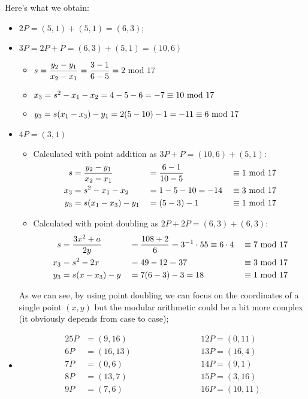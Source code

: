 \newpage
\hfill\break
Here's what we obtain:
\begin{itemize}
    \item $2P=(5,1)+(5,1)=(6,3)$;
    \item $3P=2P+P=(6,3)+(5,1)=(10,6)$
    \begin{itemize}
        \item[] $s=\dfrac{y_2-y_1}{x_2-x_1}=\dfrac{3-1}{6-5}=2\text{ mod } 17$
        \item[] $x_3=s^2-x_1-x_2=4-5-6=-7\equiv10\text{ mod }17$
        \item[] $y_3=s(x_1-x_3)-y_1=2(5-10)-1=-11\equiv6\text{ mod }17$
    \end{itemize}
    \item $4P=(3,1)$
    \begin{itemize}
        \item Calculated with point addition as $3P+P=(10,6)+(5,1)$:
        \begin{alignat*}{3}
            s&=\dfrac{y_2-y_1}{x_2-x_1}&&=\dfrac{6-1}{10-5}&&\equiv1\text{ mod } 17\\
            x_3&=s^2-x_1-x_2&&=1-5-10=-14&&\equiv3\text{ mod }17\\
            y_3&=s(x_1-x_3)-y_1&&=(5-3)-1&&\equiv1\text{ mod }17
        \end{alignat*}
        \item Calculated with point doubling as $2P+2P=(6,3)+(6,3)$:
        \begin{alignat*}{3}
            s&=\dfrac{3x^2+a}{2y}&&=\dfrac{108+2}{6}=3^{-1}\cdot55\equiv6\cdot4&&\equiv7\text{ mod } 17\\
            x_3&=s^2-2x&&=49-12=37&&\equiv3\text{ mod }17\\
            y_3&=s(x-x_3)-y&&=7(6-3)-3=18&&\equiv1\text{ mod }17
        \end{alignat*}
    \end{itemize}
    As we can see, by using point doubling we can focus on the coordinates of a single point $(x,y)$ but the modular arithmetic could be a bit more complex (it obviously depends from case to case);
    \item \begin{alignat*}{2}
        5P&=(9,16)\hspace{3cm}&&12P=(0,11)\\
        6P&=(16,13)&&13P=(16,4)\\
        7P&=(0,6)&&14P=(9,1)\\
        8P&=(13,7)&&15P=(3,16)\\
        9P&=(7,6)&&16P=(10,11)\\

\end{alignat*}
\end{itemize}
